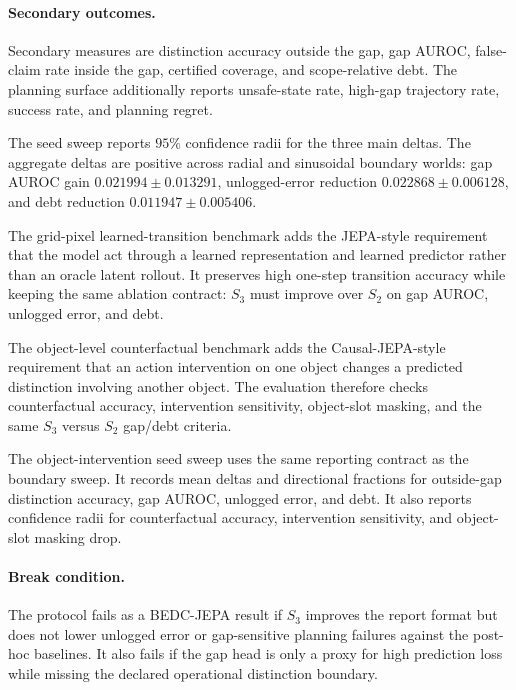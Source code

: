 \paragraph{Secondary outcomes.}
Secondary measures are distinction accuracy outside the gap, gap AUROC,
false-claim rate inside the gap, certified coverage, and scope-relative debt.
The planning surface additionally reports unsafe-state rate, high-gap
trajectory rate, success rate, and planning regret.

The seed sweep reports $95\%$ confidence radii for the three main deltas.  The
aggregate deltas are positive across radial and sinusoidal boundary worlds:
gap AUROC gain $0.021994 \pm 0.013291$, unlogged-error reduction
$0.022868 \pm 0.006128$, and debt reduction $0.011947 \pm 0.005406$.

The grid-pixel learned-transition benchmark adds the JEPA-style requirement
that the model act through a learned representation and learned predictor
rather than an oracle latent rollout.  It preserves high one-step transition
accuracy while keeping the same ablation contract: $S_3$ must improve over
$S_2$ on gap AUROC, unlogged error, and debt.

The object-level counterfactual benchmark adds the Causal-JEPA-style
requirement that an action intervention on one object changes a predicted
distinction involving another object.  The evaluation therefore checks
counterfactual accuracy, intervention sensitivity, object-slot masking, and
the same $S_3$ versus $S_2$ gap/debt criteria.

The object-intervention seed sweep uses the same reporting contract as the
boundary sweep.  It records mean deltas and directional fractions for
outside-gap distinction accuracy, gap AUROC, unlogged error, and debt.  It also
reports confidence radii for counterfactual accuracy, intervention
sensitivity, and object-slot masking drop.

\paragraph{Break condition.}
The protocol fails as a BEDC-JEPA result if $S_3$ improves the report format
but does not lower unlogged error or gap-sensitive planning failures against
the post-hoc baselines.  It also fails if the gap head is only a proxy for high
prediction loss while missing the declared operational distinction boundary.
